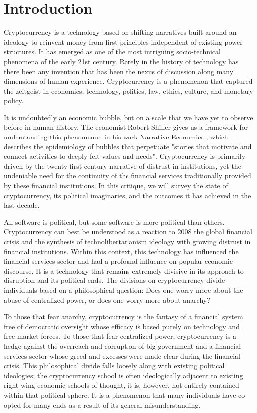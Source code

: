 \chapter{Introduction}

Cryptocurrency is a technology based on shifting narratives built around an
ideology to reinvent money from first principles independent of existing power
structures. It has emerged as one of the most intriguing socio-technical
phenomena of the early 21st century. Rarely in the history of technology has
there been any invention that has been the nexus of discussion along many
dimensions of human experience.  Cryptocurrency is a phenomenon that captured
the zeitgeist in economics, technology, politics, law, ethics, culture, and
monetary policy.

It is undoubtedly an economic bubble, but on a scale that we have yet to observe
before in human history. The economist Robert Shiller gives us a framework for
understanding this phenomenon in his work Narrative Economics
\cite{shiller_narrative_2017}, which describes the epidemiology of bubbles that
perpetuate "stories that motivate and connect activities to deeply felt values
and needs". Cryptocurrency is primarily driven by the twenty-first century
narrative of distrust in institutions, yet the undeniable need for the
continuity of the financial services traditionally provided by these financial
institutions. In this critique, we will survey the state of cryptocurrency, its
political imaginaries, and the outcomes it has achieved in the last decade.

All software is political, but some software is more political than others.
Cryptocurrency can best be understood as a reaction to 2008 the global financial
crisis and the synthesis of technolibertarianism ideology with growing distrust
in financial institutions. Within this context, this technology has influenced
the financial services sector and had a profound influence on popular economic
discourse. It is a technology that remains extremely divisive in its approach to
disruption and its political ends. The divisions on cryptocurrency divide
individuals based on a philosophical question: Does one worry more about the
abuse of centralized power, or does one worry more about anarchy?

To those that fear anarchy, cryptocurrency is the fantasy of a financial system
free of democratic oversight whose efficacy is based purely on technology and
free-market forces. To those that fear centralized power, cryptocurrency is a
hedge against the overreach and corruption of big government and a financial
services sector whose greed and excesses were made clear during the financial
crisis. This philosophical divide falls loosely along with existing political
ideologies; the cryptocurrency school is often ideologically adjacent to
existing right-wing economic schools of thought, it is, however, not entirely
contained within that political sphere. It is a phenomenon that many individuals
have co-opted for many ends as a result of its general misunderstanding.

